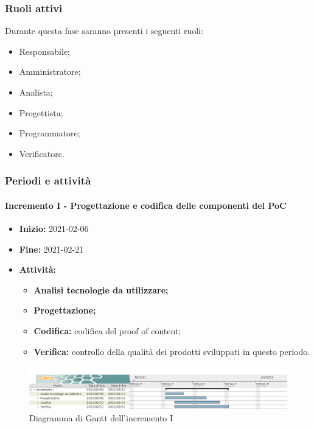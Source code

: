 \subsubsection{Ruoli attivi}
Durante questa fase saranno presenti i seguenti ruoli:
\begin{itemize}
    \item Responsabile;
    \item Amministratore;
    \item Analista;
    \item Progettista;
    \item Programmatore;
    \item Verificatore.
\end{itemize}

\subsubsection{Periodi e attività}

\paragraph[Incremento I]{Incremento I - \textnormal{Progettazione e codifica delle componenti del PoC}}
\begin{itemize}
    \item [] \textbf{Inizio:} 2021-02-06
    \item [] \textbf{Fine:} 2021-02-21
    \item [] \textbf{Attività:}
          \begin{itemize}
              \item \textbf{Analisi tecnologie da utilizzare;}
              \item \textbf{Progettazione;}
              \item \textbf{Codifica:} codifica del proof of content;
              \item \textbf{Verifica:} controllo della qualità dei prodotti sviluppati in questo periodo.
          \end{itemize}
\end{itemize}

\begin{figure}[H]
    \centering
    \includegraphics[width=1\linewidth]{res/images/pianificazione/incremento_1.png}
    \caption{Diagramma di Gantt dell'incremento I}
    \label{fig:_Gantt incremento I}
\end{figure}

